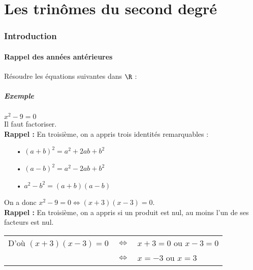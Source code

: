 \vspace*{-1.5cm}

\part{Les trinômes du second degré}

\section{Introduction}

\subsection{Rappel des années antérieures}

Résoudre les équations suivantes dans $\R$ :

\subsubsection{Exemple }

$x^2 - 9 = 0$ \\

Il faut factoriser. \\

\textbf{Rappel :} En troisième, on a appris trois identités remarquables : \\

\begin{itemize}
\item[•] $\left(a + b \right)^2 = a^2 + 2ab + b^2$ 
\item[•] $\left(a - b \right)^2 = a^2 - 2ab + b^2$ 
\item[•] $a^2 - b^2 = \left(a+b\right)\left(a-b\right)$ 
\end{itemize}

\vspace*{.3cm}

On a donc $x^2 - 9 = 0 \Longleftrightarrow \left(x+3\right)\left(x-3\right) = 0$. \\

\textbf{Rappel :} En troisième, on a appris si un produit est nul, au moins l'un de ses facteurs est nul. \\

\begin{tabular}{lll}
D'où $\left(x+3\right)\left(x-3\right) = 0$ & $ \Longleftrightarrow $ & $  x+3 = 0 $ ou $ x-3 = 0$ \\
& $\Longleftrightarrow$ & $x = -3 $ ou $x=3$ \\
\end{tabular}

